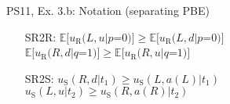 \begin{frame}{PS11, Ex. 3.b: Notation (separating PBE)}
\begin{multicols}{2}
\begin{itemize}
        \item[SR2R:] \vspace{-6pt}
                     $\mathbb{E}[u_\text{R}(L,u|p$=$0)]\geq\mathbb{E}[u_\text{R}(L,d|p$=$0)]$\\
                     $\mathbb{E}[u_\text{R}(R,d|q$=$1)]\geq \mathbb{E}[u_\text{R}(R,u|q$=$1)]$
        \item[SR2S:] \vspace{-1pt}$u_\text{S}(R,d|t_1)\geq u_\text{S}(L,a(L)|t_1)$\\
                     $u_\text{S}(L,u|t_2)\geq u_\text{S}(R,a(R)|t_2)$
      \end{itemize}
      \vfill\null \columnbreak
      \vfill
    \end{multicols}
\end{frame}



